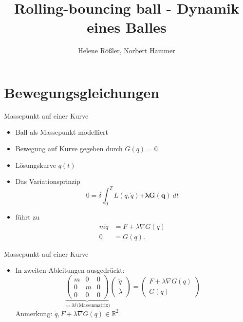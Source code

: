 \documentclass[aspectratio=169]{beamer}
\title{Rolling-bouncing ball - Dynamik eines Balles}
\author{Helene Rößler, Norbert Hammer}
\date{}
\begin{document}
\maketitle

\section{Bewegungsgleichungen}

\begin{frame}{Massepunkt auf einer Kurve}
\begin{itemize}
    \item Ball als Massepunkt modelliert
    \item Bewegung auf Kurve gegeben durch $G(q)=0$
    \item Lösungskurve $q(t)$
    \item Das Variationsprinzip
    \begin{equation*}
        0 = \delta \int_0^T L(q, \dot{q}) \boldsymbol{ + \lambda G(q)} \ dt
    \end{equation*}
    \item führt zu
        \begin{align*}
            m \ddot{q} &= F + \lambda \nabla G(q)\\
            0 &= G(q).
        \end{align*}
\end{itemize}
\end{frame}

\begin{frame}{Massepunkt auf einer Kurve}
\begin{itemize}
    \item In zweiten Ableitungen ausgedrückt:
        \begin{equation*}
        \underbrace{
        \begin{pmatrix}
          m & 0 & 0 \\
          0 & m & 0 \\
          0 & 0 & 0
        \end{pmatrix}}_{\eqcolon M ~ \text{(Massenmatrix)}}
        \begin{pmatrix} \ddot{q} \\ \ddot{\lambda} \end{pmatrix} =
        \begin{pmatrix}
          F + \lambda \nabla G(q)\\
          G(q)
        \end{pmatrix}
        \end{equation*}
        Anmerkung: $\ddot{q}, F + \lambda \nabla G(q) \in \mathbb{R}^2$
\end{itemize}
\end{frame}
\end{document}
